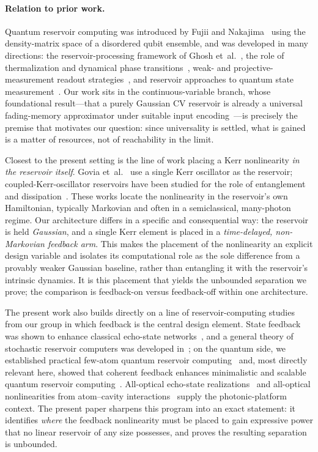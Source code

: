 \documentclass[11pt]{article}
\theoremstyle{remark}
\begin{document}
\paragraph{Relation to prior work.}
Quantum reservoir computing was introduced by Fujii and Nakajima~\cite{fujii2017}
using the density-matrix space of a disordered qubit ensemble, and was developed
in many directions: the reservoir-processing framework of Ghosh
et~al.~\cite{ghosh2019}, the role of thermalization and dynamical phase
transitions~\cite{martinezpena2021}, weak- and projective-measurement readout
strategies~\cite{mujal2023}, and reservoir approaches to quantum state
measurement~\cite{angelatos2021}. Our work sits in the continuous-variable branch,
whose foundational result---that a purely Gaussian CV reservoir is already a
universal fading-memory approximator under suitable input
encoding~\cite{nokkala2021}---is precisely the premise that motivates our question:
since universality is settled, what is gained is a matter of resources, not of
reachability in the limit.

Closest to the present setting is the line of work placing a Kerr nonlinearity
\emph{in the reservoir itself}. Govia et~al.~\cite{govia2021} use a single Kerr
oscillator as the reservoir; coupled-Kerr-oscillator reservoirs have been studied
for the role of entanglement and dissipation~\cite{karimi2025}. These works locate
the nonlinearity in the reservoir's own Hamiltonian, typically Markovian and often
in a semiclassical, many-photon regime. Our architecture differs in a specific and
consequential way: the reservoir is held \emph{Gaussian}, and a single Kerr element
is placed in a \emph{time-delayed, non-Markovian feedback arm}. This makes the
placement of the nonlinearity an explicit design variable and isolates its
computational role as the sole difference from a provably weaker Gaussian baseline,
rather than entangling it with the reservoir's intrinsic dynamics. It is this
placement that yields the unbounded separation we prove; the comparison is
feedback-on versus feedback-off within one architecture.

The present work also builds directly on a line of reservoir-computing studies from
our group in which feedback is the central design element. State feedback was shown
to enhance classical echo-state networks~\cite{ehlers2025statefeedback}, and a
general theory of stochastic reservoir computers was developed
in~\cite{ehlers2025stochastic}; on the quantum side, we established practical
few-atom quantum reservoir computing~\cite{zhu2025fewatom} and, most directly
relevant here, showed that coherent feedback enhances minimalistic and scalable
quantum reservoir computing~\cite{zhu2025feedback}. All-optical echo-state
realizations~\cite{kaushik2026alloptical} and all-optical nonlinearities from
atom--cavity interactions~\cite{zhu2025qonn} supply the photonic-platform context.
The present paper sharpens this program into an exact statement: it identifies
\emph{where} the feedback nonlinearity must be placed to gain expressive power that
no linear reservoir of any size possesses, and proves the resulting separation is
unbounded.
\end{document}
